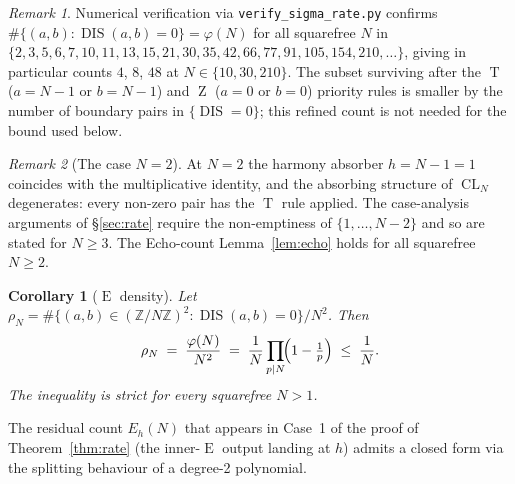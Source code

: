 \documentclass[11pt,reqno]{amsart}
\theoremstyle{plain}
\newtheorem{corollary}[theorem]{Corollary}
\theoremstyle{definition}
\theoremstyle{remark}
\newtheorem*{remark}{Remark}
\DeclareMathOperator{\DIS}{DIS}
\DeclareMathOperator{\CL}{CL}
\DeclareMathOperator{\ECHO}{E}
\DeclareMathOperator{\HARM}{T}
\DeclareMathOperator{\VOID}{Z}
\newcommand{\ZN}{\mathbb{Z}/N\mathbb{Z}}
\begin{document}
\begin{remark}
Numerical verification via \texttt{verify\_sigma\_rate.py} confirms
$\#\{(a,b):\DIS(a,b)=0\}=\varphi(N)$ for all squarefree $N$ in
$\{2,3,5,6,7,10,11,13,15,21,30,35,42,66,77,91,105,154,210,\dots\}$,
giving in particular counts $4$, $8$, $48$ at $N\in\{10,30,210\}$.
The subset surviving after the $\HARM$ ($a=N-1$ or $b=N-1$) and
$\VOID$ ($a=0$ or $b=0$) priority rules is smaller by the number of
boundary pairs in $\{\DIS=0\}$; this refined count is not needed for
the bound used below.
\end{remark}

\begin{remark}[The case $N=2$]\label{rem:Nis2}
At $N=2$ the harmony absorber $h=N-1=1$ coincides with the
multiplicative identity, and the absorbing structure of $\CL_N$
degenerates: every non-zero pair has the $\HARM$ rule applied. The
case-analysis arguments of \S\ref{sec:rate} require the
non-emptiness of $\{1,\dots,N-2\}$ and so are stated for $N\ge 3$.
The Echo-count Lemma~\ref{lem:echo} holds for all squarefree $N\ge 2$.
\end{remark}

\begin{corollary}[$\ECHO$ density]\label{cor:echo-density}
Let $\rho_N=\#\{(a,b)\in(\ZN)^{2}:\DIS(a,b)=0\}/N^{2}$. Then
\begin{equation}\label{eq:rho}
  \rho_N\;=\;\frac{\varphi(N)}{N^{2}}
  \;=\;\frac{1}{N}\prod_{p\mid N}\!\Bigl(1-\tfrac{1}{p}\Bigr)
  \;\le\;\frac{1}{N}.
\end{equation}
The inequality is strict for every squarefree $N>1$.
\end{corollary}

The residual count $E_{h}(N)$ that appears in Case~1 of the proof of
Theorem~\ref{thm:rate} (the inner-$\ECHO$ output landing at $h$) admits a
closed form via the splitting behaviour of a degree-2 polynomial.
\end{document}
